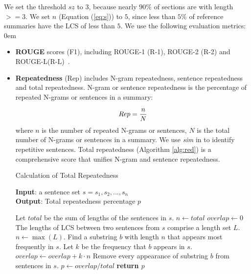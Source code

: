 We set the threshold $sz$ to $3$, 
because nearly $90\%$ 
of sections are with length$>=$3.
We set $n$ (Equation (\ref{eq:s})) to $5$,
since less than $5\%$ of reference summaries have
the LCS of less than $5$.
We use the following evaluation metrics:
\itemsep0em
\begin{itemize}

\item \textbf{ROUGE} scores (F1), including ROUGE-1 (R-1), ROUGE-2 (R-2) and
ROUGE-L(R-L)~\cite{rouge-a-package-for-automatic-evaluation-of-summaries}.

\item \textbf{Repeatedness} (Rep) includes N-gram repeatedness, sentence repeatedness
and total repeatedness. 
N-gram or sentence repeatedness is the percentage of repeated N-grams 
or sentences in a summary:

\begin{equation}
\small Rep = \frac{n}{N}
\end{equation}
where $n$ is the number of repeated N-grams or sentences, 
$N$ is the total number of N-grams or sentences in a summary.
We use \textit{sim} in  to
identify repetitive sentences.
Total repeatedness (Algorithm \ref{alg:red}) is a comprehensive score that unifies N-gram and sentence repeatedness.

\begin{algorithm}[th]
\caption{Calculation of Total Repeatedness}
\scriptsize
\label{alg:red}
\textbf{Input}: a sentence set $s = {s_{1}, s_{2},...,s_{n}}$\\
\textbf{Output}: Total repeatedness percentage $p$
\begin{algorithmic}[1] %
\STATE Let $total$ be the sum of lengths of the sentences in $s$.
\STATE $n \leftarrow total$
\STATE $overlap \leftarrow 0$
\STATE The lengths of LCS between two sentences from $s$ comprise a length set $L$.
\STATE $n \leftarrow \max(L)$.
\STATE Find a substring $b$ with length $n$ that appears most frequently in $s$.
\STATE Let $k$ be the frequency that $b$ appears in $s$.
\STATE $overlap \leftarrow overlap + k\cdot n$
\STATE Remove every appearance of substring $b$ from sentences in $s$.
\ENDWHILE
\STATE $p \leftarrow overlap/total$
\STATE \textbf{return $p$} 
\end{algorithmic}
\end{algorithm}


\end{itemize}
